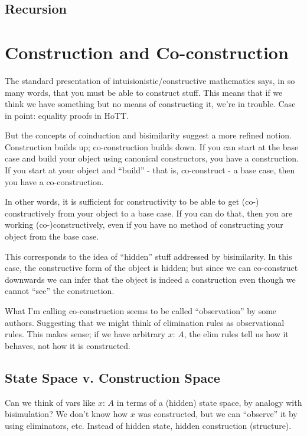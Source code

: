 \documentclass{article}
\begin{document}
\subsection{Recursion}


\section{Construction and Co-construction}

The standard presentation of intuisionistic/constructive mathematics
says, in so many words, that you must be able to construct stuff.
This means that if we think we have something but no means of
constructing it, we're in trouble.  Case in point: equality proofs in
HoTT.

But the concepts of coinduction and bisimilarity suggest a more
refined notion.  Construction builds up; co-construction builds down.
If you can start at the base case and build your object using
canonical constructors, you have a construction.  If you start at your
object and ``build'' - that is, co-construct - a base case, then you
have a co-construction.

In other words, it is sufficient for constructivity to be able to get
(co-) constructively from your object to a base case.  If you can do
that, then you are working (co-)constructively, even if you have no
method of constructing your object from the base case.

This corresponds to the idea of ``hidden'' stuff addressed by
bisimilarity.  In this case, the constructive form of the object is
hidden; but since we can co-construct downwards we can infer that the
object is indeed a construction even though we cannot ``see'' the
construction.

\begin{remark}
  What I'm calling co-construction seems to be called ``observation''
  by some authors.  Suggesting that we might think of elimination
  rules as observational rules.  This makes sense; if we have
  arbitrary \(x{:}\,A\), the elim rules tell us how it behaves, not
  how it is constructed.
\end{remark}

\subsection{State Space v. Construction Space}

Can we think of vars like \(x{:}\,A\) in terms of a (hidden) state
space, by analogy with bisimulation?  We don't know how \(x\) was
constructed, but we can ``observe'' it by using eliminators, etc.
Instead of hidden state, hidden construction (structure).
\end{document}
